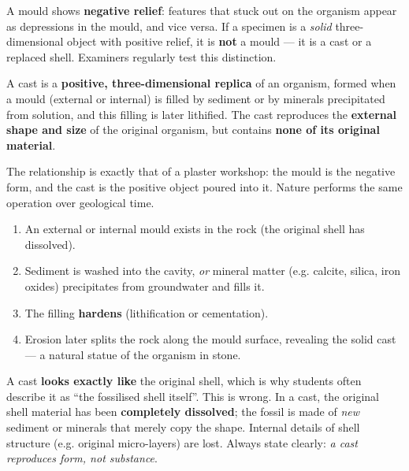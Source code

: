 \documentclass[11pt]{article}
\newcommand{\cle}[1]{{\popxbold\color{popdark}#1}}
\newcounter{popsec}
\newcounter{popsub}
\newcommand{\courssub}[1]{%
  \stepcounter{popsub}%
  \par\vspace{9pt}\noindent{\popxbold\fontsize{11.5}{13}\selectfont\color{popink}{\color{poporange}\thepopsec.\thepopsub}\hspace{6pt}#1}\par\nopagebreak\vspace{4pt}
}
\begin{document}
\begin{attention}
A mould shows \textbf{negative relief}: features that stuck out on the organism appear as depressions in the mould, and vice versa. If a specimen is a \emph{solid} three-dimensional object with positive relief, it is \textbf{not} a mould — it is a cast or a replaced shell. Examiners regularly test this distinction.
\end{attention}

\courssub{Casts: Positive Replicas}

\begin{definition}[Cast]
A \cle{cast} is a \textbf{positive, three-dimensional replica} of an organism, formed when a mould (external or internal) is filled by sediment or by minerals precipitated from solution, and this filling is later lithified. The cast reproduces the \textbf{external shape and size} of the original organism, but contains \textbf{none of its original material}.
\end{definition}

The relationship is exactly that of a plaster workshop: the mould is the negative form, and the cast is the positive object poured into it. Nature performs the same operation over geological time.

\begin{methode}
\begin{enumerate}
\item An external or internal mould exists in the rock (the original shell has dissolved).
\item Sediment is washed into the cavity, \emph{or} mineral matter (e.g. calcite, silica, iron oxides) precipitates from groundwater and fills it.
\item The filling \textbf{hardens} (lithification or cementation).
\item Erosion later splits the rock along the mould surface, revealing the solid cast — a natural statue of the organism in stone.
\end{enumerate}
\end{methode}

\begin{attention}
A cast \textbf{looks exactly like} the original shell, which is why students often describe it as ``the fossilised shell itself''. This is wrong. In a cast, the original shell material has been \textbf{completely dissolved}; the fossil is made of \emph{new} sediment or minerals that merely copy the shape. Internal details of shell structure (e.g. original micro-layers) are lost. Always state clearly: \emph{a cast reproduces form, not substance}.
\end{attention}
\end{document}
